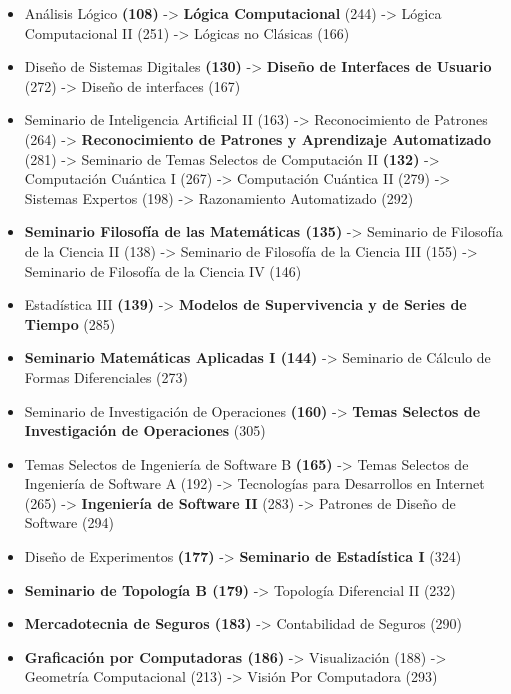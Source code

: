 \begin{appendices}
\begin{itemize}
  \item Análisis Lógico \textbf{(108)} -> \textbf{Lógica Computacional} (244) -> Lógica Computacional II (251) -> Lógicas no Clásicas (166)
  
  \item Diseño de Sistemas Digitales \textbf{(130)} -> \textbf{Diseño de Interfaces de Usuario} (272) -> Diseño de interfaces (167)

  \item Seminario de Inteligencia Artificial II (163) -> Reconocimiento de Patrones (264) -> \textbf{Reconocimiento de Patrones y Aprendizaje Automatizado} (281) -> Seminario de Temas Selectos de Computación II \textbf{(132)} -> Computación Cuántica I (267) -> Computación Cuántica II (279) -> Sistemas Expertos (198) -> Razonamiento Automatizado (292)

  \item \textbf{Seminario Filosofía de las Matemáticas (135)} -> Seminario de Filosofía de la Ciencia II (138) -> Seminario de Filosofía de la Ciencia III (155) -> Seminario de Filosofía de la Ciencia IV (146)
  
  \item Estadística III \textbf{(139)} -> \textbf{Modelos de Supervivencia y de Series de Tiempo} (285)
    
  \item \textbf{Seminario Matemáticas Aplicadas I (144)} -> Seminario de Cálculo de Formas Diferenciales (273)
  
  \item Seminario de Investigación de Operaciones \textbf{(160)} -> \textbf{Temas Selectos de Investigación de Operaciones} (305)
  
  \item Temas Selectos de Ingeniería de Software B \textbf{(165)} -> Temas Selectos de Ingeniería de Software A (192) -> Tecnologías para Desarrollos en Internet (265) -> \textbf{Ingeniería de Software II} (283) -> Patrones de Diseño de Software (294)
  
  \item Diseño de Experimentos \textbf{(177)} -> \textbf{Seminario de Estadística I} (324)

  \item \textbf{Seminario de Topología B (179)} -> Topología Diferencial II (232)

  \item \textbf{Mercadotecnia de Seguros (183)} -> Contabilidad de Seguros (290)
  
  \item \textbf{Graficación por Computadoras (186)} -> Visualización (188) -> Geometría Computacional (213) -> Visión Por Computadora (293)
  

\end{itemize}
\end{appendices}
